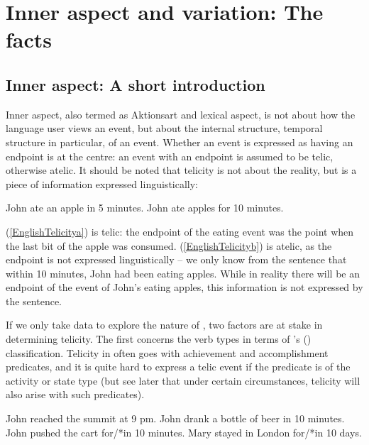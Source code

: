 \documentclass[output=paper]{langsci/langscibook}
\begin{document}
\section{Inner aspect and variation: The facts}\label{sec:17.2}

\subsection{Inner aspect: A short introduction}\label{sub:17.2.1}

Inner aspect, also termed as Aktionsart and lexical aspect, is not about how
the language user views an event, but about the internal structure, temporal
structure in particular, of an event. Whether an event is expressed as having
an endpoint is at the centre: an event with an endpoint is assumed to be telic,
otherwise atelic. It should be noted that telicity is not about the reality,
but is a piece of information expressed linguistically:

\begin{exe}
\ex\begin{xlist}
	\ex\label{EnglishTelicitya} John ate an apple in 5 minutes.
    \ex\label{EnglishTelicityb} John ate apples for 10 minutes.
\end{xlist}
\end{exe}

(\ref{EnglishTelicitya}) is telic: the endpoint of the eating event was the
point when the last bit of the apple was consumed. (\ref{EnglishTelicityb}) is
atelic, as the endpoint is not expressed linguistically -- we only know from
the sentence that within 10 minutes, John had been eating apples. While in
reality there will be an endpoint of the event of John's eating apples, this
information is not expressed by the sentence.

If we only take  data to explore the nature of , two factors
are at stake in determining telicity. The first concerns the verb types in
terms of \citeauthor{vendler1957verbs}'s (\citeyear{vendler1957verbs})
classification. Telicity in  often goes with achievement and
accomplishment predicates, and it is quite hard to express a telic event if the
predicate is of the activity or state type (but see later that under certain
circumstances, telicity will also arise with such predicates).

\begin{exe}
\ex\begin{xlist}
	\ex\label{VendlerAchievement} John reached the summit at 9 pm.
    \ex\label{VendlerAccomplishment} John drank a bottle of beer in 10 minutes.
    \ex\label{VendlerActivity} John pushed the cart for/*in 10 minutes.
    \ex\label{VendlerState} Mary stayed in London for/*in 10 days.
\end{xlist}
\end{exe}
\end{document}
